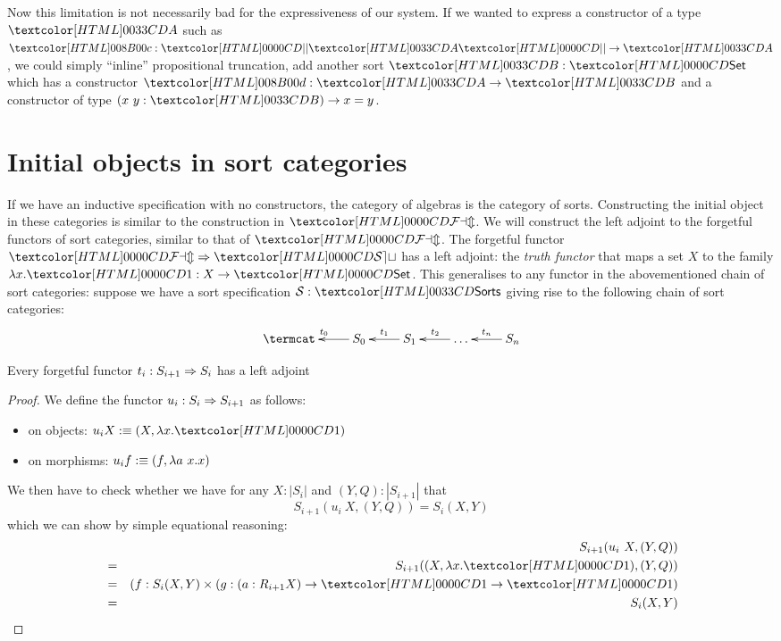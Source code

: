 Now this limitation is not necessarily bad for the expressiveness of
our system. If we wanted to express a constructor of a type $\Aty$
such as $\Ac : \proptrunc{\Aty} \to \Aty$, we could simply ``inline''
propositional truncation, \ie add another sort $\Bty : \Set$ which has
a constructor $\Bd : \Aty \to \Bty$ and a constructor of type
$(x\ y : \Bty) \to x = y$.

\section{Initial objects in sort categories}

If we have an inductive specification with no constructors, the
category of algebras is the category of sorts. Constructing the
initial object in these categories is similar to the construction in
$\FAM$. We will construct the left adjoint to the forgetful functors
of sort categories, similar to that of $\FAM$. The forgetful functor
$\Func{\FAM}{\SET}$ has a left adjoint: the \emph{truth functor} that
maps a set $X$ to the family $\lambda x . \unitty : X \to \Set$. This
generalises to any functor in the abovementioned chain of sort
categories: suppose we have a sort specification $\Ss : \sortsty$
giving rise to the following chain of sort categories:
$$
\xymatrix{
\termcat &S_0 \ar[l]_{t_0} &S_1 \ar[l]_{t_1} &\hdots \ar[l]_{t_2} &S_n \ar[l]_{t_n}
}
$$

\begin{proposition}
Every forgetful functor $t_i : S_{i+1} \Rightarrow S_i$ has a left adjoint
\end{proposition}

\begin{proof}
  We define the functor $u_i : S_i \Rightarrow S_{i+1}$ as follows:
  \begin{itemize}
  \item on objects: $u_i X \ddefeq (X , \lambda x . \unitty)$
  \item on morphisms: $u_i f :\equiv (f , \lambda a\ x . x)$
  \end{itemize}
  We then have to check whether we have for any $X : | S_i |$ and
  $(Y,Q) : | S_{i+1} |$ that
  $$
  S_{i+1}(u_i\ X , (Y,Q)) = S_i(X,Y)
  $$
  which we can show by simple equational reasoning:
  \begin{align*}
      &&S_{i+1}(u_i\ X , (Y,Q)) \\
    &=& S_{i+1}((X,\lambda x . \unitty), (Y,Q)) \\
    &=& (f : S_i(X,Y) \times (g : (a : R_{i+1} X) \to \unitty \to \unitty) \\
    &=& S_i(X,Y)
  \end{align*}

\end{proof}

